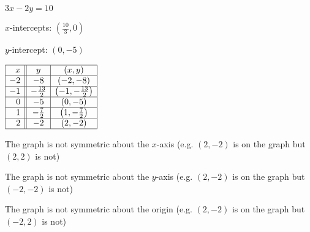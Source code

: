 {$3x-2y = 10$}
{$x$-intercepts: $\left(\frac{10}{3}, 0 \right)$ \smallskip

$y$-intercept: $(0, -5)$ \smallskip

$\begin{array}{|r||c|c|}  

\hline
 x &  y & (x,y) \\ \hline
-2 & -8 & (-2, -8) \\  \hline
-1 &  -\frac{13}{2} & \left(-1, -\frac{13}{2}\right) \\ \hline
 0 &  -5 & (0, -5) \\ \hline
 1 &  -\frac{7}{2} & \left(1, -\frac{7}{2} \right) \\ \hline
 2 &  -2 & (2, -2) \\ \hline
 
\end{array} $ \smallskip


\smallskip

The graph is not symmetric about the $x$-axis (e.g. $(2, -2)$ is on the graph but $(2,2)$ is not) \smallskip

The graph is not symmetric about the $y$-axis (e.g. $(2, -2)$ is on the graph but $(-2, -2)$ is not) \smallskip

The graph is not symmetric about the origin  (e.g. $(2, -2)$ is on the graph but $(-2, 2)$ is not)}